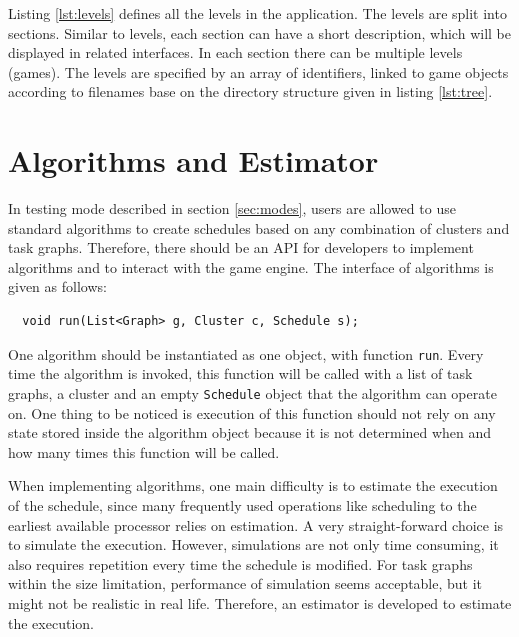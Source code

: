\documentclass[msc,deptreport, cs]{infthesis}
\begin{document}
Listing \ref{lst:levels} defines all the levels in the application. The levels are split into sections. Similar to levels, each section can have a short description, which will be displayed in related interfaces. In each section there can be multiple levels (games). The levels are specified by an array of identifiers, linked to game objects according to filenames base on the directory structure given in listing \ref{lst:tree}.

\section{Algorithms and Estimator}

In testing mode described in section \ref{sec:modes}, users are allowed to use standard algorithms to create schedules based on any combination of clusters and task graphs. Therefore, there should be an API for developers to implement algorithms and to interact with the game engine. 
The interface of algorithms is given as follows:
\vspace{0.5em}\begin{lstlisting}
  void run(List<Graph> g, Cluster c, Schedule s);
\end{lstlisting}
One algorithm should be instantiated as one object, with function \verb+run+. Every time the algorithm is invoked, this function will be called with a list of task graphs, a cluster and an empty \verb+Schedule+ object that the algorithm can operate on. One thing to be noticed is execution of this function should not rely on any state stored inside the algorithm object because it is not determined when and how many times this function will be called.

When implementing algorithms, one main difficulty is to estimate the execution of the schedule, since many frequently used operations like scheduling to the earliest available processor relies on estimation. A very straight-forward choice is to simulate the execution. However, simulations are not only time consuming, it also requires repetition every time the schedule is modified. For task graphs within the size limitation, performance of simulation seems acceptable, but it might not be realistic in real life. Therefore, an estimator is developed to estimate the execution.
\end{document}
